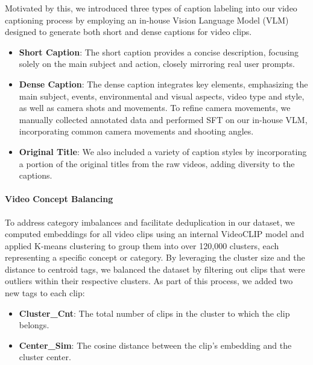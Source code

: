 Motivated by this, we introduced three types of caption labeling into our video captioning process by employing an in-house Vision Language Model (VLM) designed to generate both short and dense captions for video clips.
\begin{itemize}[left=0cm]
    \item \textbf{Short Caption}: The short caption provides a concise description, focusing solely on the main subject and action, closely mirroring real user prompts.

    \item \textbf{Dense Caption}: The dense caption integrates key elements, emphasizing the main subject, events, environmental and visual aspects, video type and style, as well as camera shots and movements. To refine camera movements, we manually collected annotated data and performed SFT on our in-house VLM, incorporating common camera movements and shooting angles.
    
    \item \textbf{Original Title}: We also included a variety of caption styles by incorporating a portion of the original titles from the raw videos, adding diversity to the captions.
    
\end{itemize}



\paragraph{Video Concept Balancing}
To address category imbalances and facilitate deduplication in our dataset, we computed embeddings for all video clips using an internal VideoCLIP model and applied K-means clustering \cite{macqueen1967some} to group them into over 120,000 clusters, each representing a specific concept or category. By leveraging the cluster size and the distance to centroid tags, we balanced the dataset by filtering out clips that were outliers within their respective clusters. As part of this process, we added two new tags to each clip:

\begin{itemize}[left=0cm] 
    \item \textbf{Cluster\_Cnt}: The total number of clips in the cluster to which the clip belongs.

    \item \textbf{Center\_Sim}: The cosine distance between the clip's embedding and the cluster center.
\end{itemize}



